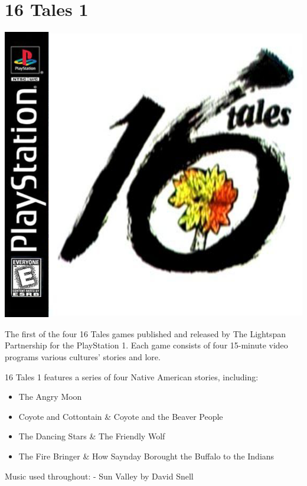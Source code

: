 \chapter{16 Tales 1}

\includegraphics[width=\textwidth/2]{"./Games/16Tales/16TalesGeneralLogo.png"}

The first of the four 16 Tales games published and released by The Lightspan Partnership for the PlayStation 1. Each game consists of four 15-minute video programs various cultures' stories and lore.

16 Tales 1 features a series of four Native American stories, including:
\begin{itemize}
    \item The Angry Moon %
    \item Coyote and Cottontain \& Coyote and the Beaver People
    \item The Dancing Stars \& The Friendly Wolf
    \item The Fire Bringer \& How Saynday Borought the Buffalo to the Indians
\end{itemize}

Music used throughout:
- Sun Valley by David Snell

